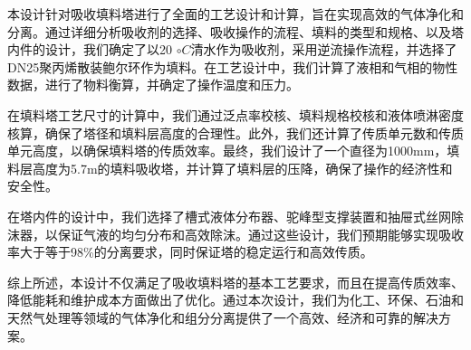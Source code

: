 \begin{conclusion}

本设计针对吸收填料塔进行了全面的工艺设计和计算，旨在实现高效的气体净化和分离。通过详细分析吸收剂的选择、吸收操作的流程、填料的类型和规格、以及塔内件的设计，我们确定了以20 $\circ C$清水作为吸收剂，采用逆流操作流程，并选择了DN25聚丙烯散装鲍尔环作为填料。在工艺设计中，我们计算了液相和气相的物性数据，进行了物料衡算，并确定了操作温度和压力。

在填料塔工艺尺寸的计算中，我们通过泛点率校核、填料规格校核和液体喷淋密度核算，确保了塔径和填料层高度的合理性。此外，我们还计算了传质单元数和传质单元高度，以确保填料塔的传质效率。最终，我们设计了一个直径为1000mm，填料层高度为5.7m的填料吸收塔，并计算了填料层的压降，确保了操作的经济性和安全性。

在塔内件的设计中，我们选择了槽式液体分布器、驼峰型支撑装置和抽屉式丝网除沫器，以保证气液的均匀分布和高效除沫。通过这些设计，我们预期能够实现吸收率大于等于98\%的分离要求，同时保证塔的稳定运行和高效传质。

综上所述，本设计不仅满足了吸收填料塔的基本工艺要求，而且在提高传质效率、降低能耗和维护成本方面做出了优化。通过本次设计，我们为化工、环保、石油和天然气处理等领域的气体净化和组分分离提供了一个高效、经济和可靠的解决方案。

\end{conclusion}